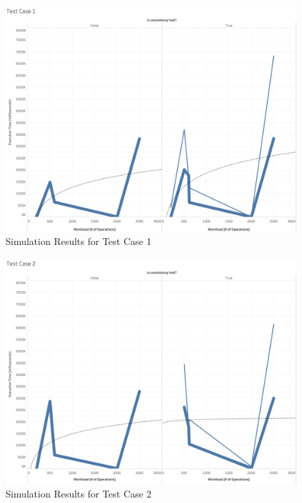 \begin{figure}
\centering
\includegraphics[scale=0.23]{images/TestCase1(WL).png}
\caption{Simulation Results for Test Case 1}
\label{results:test_case_graphs_1}
\end{figure}

\begin{figure}
\centering
\includegraphics[scale=0.23]{images/TestCase2(WL).png}
\caption{Simulation Results for Test Case 2}
\label{results:test_case_graphs_2}
\end{figure}

